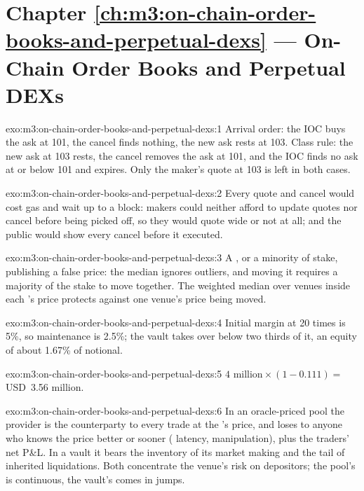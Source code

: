 \section*{Chapter \ref{ch:m3:on-chain-order-books-and-perpetual-dexs} --- On-Chain Order Books and Perpetual DEXs}

\begin{solution}{exo:m3:on-chain-order-books-and-perpetual-dexs:1}
Arrival order: the IOC buys the ask at 101, the cancel finds nothing, the new ask rests at 103. Class rule: the new ask at 103 rests, the
cancel removes the ask at 101, and the IOC finds no ask at or below 101 and expires. Only the maker's quote at 103 is left in both cases.
\end{solution}

\begin{solution}{exo:m3:on-chain-order-books-and-perpetual-dexs:2}
Every quote and cancel would cost gas and wait up to a block: makers could neither afford to update quotes nor cancel before being picked
off, so they would quote wide or not at all; and the public  would show every cancel before it executed.
\end{solution}

\begin{solution}{exo:m3:on-chain-order-books-and-perpetual-dexs:3}
A , or a minority of stake, publishing a false price: the median ignores outliers, and moving it requires a majority of the stake to
move together. The weighted median over venues inside each 's price protects against one venue's price being moved.
\end{solution}

\begin{solution}{exo:m3:on-chain-order-books-and-perpetual-dexs:4}
Initial margin at 20 times is 5\%, so maintenance is 2.5\%; the vault takes over below two thirds of it, an equity of about 1.67\% of notional.
\end{solution}

\begin{solution}{exo:m3:on-chain-order-books-and-perpetual-dexs:5}
$4\text{ million} \times (1 - 0.111) = $ USD~3.56 million.
\end{solution}

\begin{solution}{exo:m3:on-chain-order-books-and-perpetual-dexs:6}
In an oracle-priced pool the provider is the counterparty to every trade at the 's price, and loses to anyone who knows the price better or
sooner ( latency, manipulation), plus the traders' net P\&L. In a vault it bears the inventory of its market making and the tail of inherited
liquidations. Both concentrate the venue's risk on depositors; the pool's is continuous, the vault's comes in jumps.
\end{solution}

